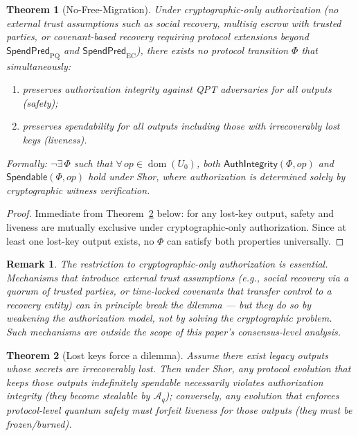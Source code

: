 \documentclass[11pt]{article}
\newtheorem{theorem}{Theorem}
\newtheorem{remark}{Remark}
\newcommand{\dom}{\operatorname{dom}}
\newcommand{\Aq}{\mathcal{A}_q}
\newcommand{\SpendPred}{\mathsf{SpendPred}}
\newcommand{\SpendPredPQ}{\SpendPred_{\mathrm{PQ}}}
\newcommand{\SpendPredEC}{\SpendPred_{\mathrm{EC}}}
\begin{document}
\begin{theorem}[No-Free-Migration]\label{thm:no-free-migration}
Under cryptographic-only authorization (no external trust assumptions such as social recovery, multisig escrow with trusted parties, or covenant-based recovery requiring protocol extensions beyond $\SpendPredPQ$ and $\SpendPredEC$), there exists no protocol transition $\Phi$ that simultaneously:
\begin{enumerate}[leftmargin=2em]
  \item preserves authorization integrity against QPT adversaries for all outputs (safety);
  \item preserves spendability for all outputs including those with irrecoverably lost keys (liveness).
\end{enumerate}
Formally: $\neg\exists\,\Phi$ such that $\forall\, op\in\dom(U_0)$, both $\textsf{AuthIntegrity}(\Phi,op)$ and $\textsf{Spendable}(\Phi,op)$ hold under Shor, where authorization is determined solely by cryptographic witness verification.
\end{theorem}

\begin{proof}
Immediate from Theorem~\ref{thm:dilemma} below: for any lost-key output, safety and liveness are mutually exclusive under cryptographic-only authorization.
Since at least one lost-key output exists, no $\Phi$ can satisfy both properties universally.
\end{proof}

\begin{remark}
The restriction to cryptographic-only authorization is essential.
Mechanisms that introduce external trust assumptions (e.g., social recovery via a quorum of trusted parties, or time-locked covenants that transfer control to a recovery entity) can in principle break the dilemma --- but they do so by weakening the authorization model, not by solving the cryptographic problem.
Such mechanisms are outside the scope of this paper's consensus-level analysis.
\end{remark}

\begin{theorem}[Lost keys force a dilemma]\label{thm:dilemma}
Assume there exist legacy outputs whose secrets are irrecoverably lost.
Then under Shor, any protocol evolution that keeps those outputs indefinitely spendable necessarily violates authorization integrity (they become stealable by $\Aq$); conversely, any evolution that enforces protocol-level quantum safety must forfeit liveness for those outputs (they must be frozen/burned).
\end{theorem}
\end{document}
